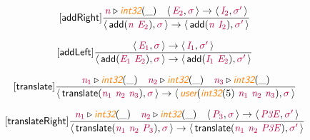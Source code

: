 \documentclass[10pt,leqno,fleqn]{article}
\newcommand{\artVariable}[1]{\mbox{\color{purple}\em #1\/}}
\newcommand{\artConstructor}[1]{\mbox{\sf #1}}
\newcommand{\artSpecial}[1]{\mbox{\color{orange}\sf\em #1}}
\begin{document}
\begin{equation}
\tag*{[\artConstructor{\sf addRight}]}
\begin{split}\frac{ \artVariable{n}\triangleright \artSpecial{int32}(\_) \quad \langle\, \artVariable{E$_{2}$}, \artVariable{$\sigma$}\,\rangle \rightarrow \langle\, \artVariable{I$_{2}$}, \artVariable{$\sigma$\/$^\prime$}\,\rangle }{\langle\, \artConstructor{\sf add}(\artVariable{n}\ \artVariable{E$_{2}$}), \artVariable{$\sigma$}\,\rangle \rightarrow \langle\, \artConstructor{\sf add}(\artVariable{n}\ \artVariable{I$_{2}$}), \artVariable{$\sigma$\/$^\prime$}\,\rangle }
\end{split}
\end{equation}

\begin{equation}
\tag*{[\artConstructor{\sf addLeft}]}
\begin{split}\frac{\langle\, \artVariable{E$_{1}$}, \artVariable{$\sigma$}\,\rangle \rightarrow \langle\, \artVariable{I$_{1}$}, \artVariable{$\sigma$\/$^\prime$}\,\rangle }{\langle\, \artConstructor{\sf add}(\artVariable{E$_{1}$}\ \artVariable{E$_{2}$}), \artVariable{$\sigma$}\,\rangle \rightarrow \langle\, \artConstructor{\sf add}(\artVariable{I$_{1}$}\ \artVariable{E$_{2}$}), \artVariable{$\sigma$\/$^\prime$}\,\rangle }
\end{split}
\end{equation}

\begin{equation}
\tag*{[\artConstructor{\sf translate}]}
\begin{split}\frac{ \artVariable{n$_{1}$}\triangleright \artSpecial{int32}(\_) \quad  \artVariable{n$_{2}$}\triangleright \artSpecial{int32}(\_) \quad  \artVariable{n$_{3}$}\triangleright \artSpecial{int32}(\_) }{\langle\, \artConstructor{\sf translate}(\artVariable{n$_{1}$}\ \artVariable{n$_{2}$}\ \artVariable{n$_{3}$}), \artVariable{$\sigma$}\,\rangle \rightarrow \langle\, \artSpecial{user}(\artSpecial{int32}(5)\ \artVariable{n$_{1}$}\ \artVariable{n$_{2}$}\ \artVariable{n$_{3}$}), \artVariable{$\sigma$}\,\rangle }
\end{split}
\end{equation}

\begin{equation}
\tag*{[\artConstructor{\sf translateRight}]}
\begin{split}\frac{ \artVariable{n$_{1}$}\triangleright \artSpecial{int32}(\_) \quad  \artVariable{n$_{2}$}\triangleright \artSpecial{int32}(\_) \quad \langle\, \artVariable{P$_{3}$}, \artVariable{$\sigma$}\,\rangle \rightarrow \langle\, \artVariable{P3E}, \artVariable{$\sigma$\/$^\prime$}\,\rangle }{\langle\, \artConstructor{\sf translate}(\artVariable{n$_{1}$}\ \artVariable{n$_{2}$}\ \artVariable{P$_{3}$}), \artVariable{$\sigma$}\,\rangle \rightarrow \langle\, \artConstructor{\sf translate}(\artVariable{n$_{1}$}\ \artVariable{n$_{2}$}\ \artVariable{P3E}), \artVariable{$\sigma$\/$^\prime$}\,\rangle }
\end{split}
\end{equation}
\end{document}
